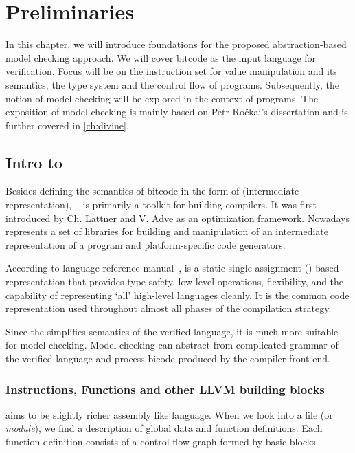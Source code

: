 \chapter{Preliminaries}\label{ch:preliminaries}

In this chapter, we will introduce foundations for the proposed
abstraction-based model checking approach. We will cover \LLVM bitcode as the
input language for verification. Focus will be on the instruction set for
value manipulation and its semantics, the \LLVM type system and the control flow
of programs. Subsequently, the notion of model checking will be explored in
the context of \LLVM programs. The exposition of model checking is mainly based on
Petr Ročkai's dissertation \cite{Rockai15} and is further covered in \autoref{ch:divine}.

\section{Intro to \LLVMIR} \label{sec:introtollvm}

Besides defining the semantics of bitcode in the form of \LLVMIR (intermediate
representation), \LLVM{}~\cite{LLVM:web} is primarily a toolkit for building
compilers. It was first introduced by Ch. Lattner and V. Adve \cite{Lattner04}
as an optimization framework. Nowadays \LLVM represents a set of libraries for
building and manipulation of an intermediate representation of a program and
platform-specific code generators.

According to \LLVM language reference manual~\cite{LLVM:langref},
\LLVM is a static single assignment (\SSA) based representation that
provides type safety, low-level operations, flexibility, and
the capability of representing ‘all’ high-level languages cleanly. It is the
common code representation used throughout almost all phases of the \LLVM compilation
strategy.

Since the \LLVMIR simplifies semantics of the verified language, it is much more
suitable for model checking. Model checking can abstract from complicated
grammar of the verified language and process \LLVM bicode produced by the compiler
front-end.

\subsection{Instructions, Functions and other LLVM building blocks} \label{subsec:infnllvm}
\LLVMIR aims to be slightly richer assembly like language. When we look
into a \LLVMIR file (or \emph{module}), we find a description of global
data and function definitions. Each function definition consists of a control flow graph
formed by basic blocks.

